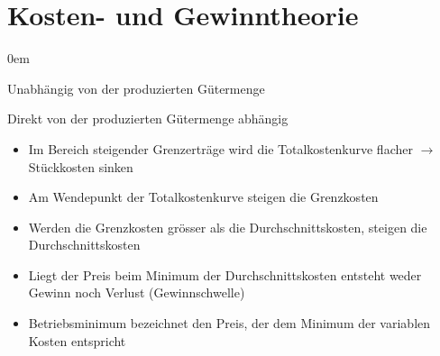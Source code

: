 \section{Kosten- und Gewinntheorie}
\begin{description}\itemsep0em
	\item [Fixkosten] Unabhängig von der produzierten Gütermenge
	\item [Variable Kosten] Direkt von der produzierten Gütermenge abhängig
\end{description}

\begin{itemize}\itemsep0em
	\item Im Bereich steigender Grenzerträge wird die Totalkostenkurve flacher $\rightarrow$ Stückkosten sinken
	\item Am Wendepunkt der Totalkostenkurve steigen die Grenzkosten
	\item Werden die Grenzkosten grösser als die Durchschnittskosten, steigen die Durchschnittskosten
	\item Liegt der Preis beim Minimum der Durchschnittskosten entsteht weder Gewinn noch Verlust (Gewinnschwelle)
	\item Betriebsminimum bezeichnet den Preis, der dem Minimum der variablen Kosten entspricht 
\end{itemize}

